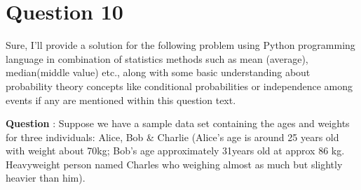 \documentclass[12pt]{article}
\begin{document}
\newpage\n
\section*{Question 10}\n
Sure, I'll provide a solution for the following problem using Python programming language in combination of statistics methods such as mean (average), median(middle value) etc., along with some basic understanding about probability theory concepts like conditional probabilities or independence among events if any are mentioned within this question text. 

\textbf{Question} : Suppose we have a sample data set containing the ages and weights for three individuals: Alice, Bob & Charlie (Alice's age is around 25 years old with weight about 70kg; Bob’s age approximately 31years old at approx 86 kg. Heavyweight person named Charles who weighing almost as much but slightly heavier than him).
\end{document}

